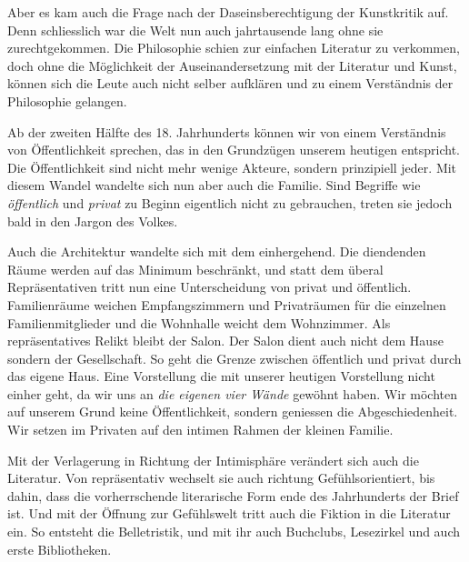 \documentclass[a4paper,ngerman,11pt]{scrartcl}
\begin{document}
Aber es kam auch die Frage nach der Daseinsberechtigung der Kunstkritik
auf. Denn schliesslich war die Welt nun auch jahrtausende lang ohne sie
zurechtgekommen. Die Philosophie schien zur einfachen Literatur zu verkommen,
doch ohne die Möglichkeit der Auseinandersetzung mit der Literatur und Kunst,
können sich die Leute auch nicht selber aufklären und zu einem Verständnis der
Philosophie gelangen.

Ab der zweiten Hälfte des 18. Jahrhunderts können wir von einem Verständnis
von Öffentlichkeit sprechen, das in den Grundzügen unserem heutigen
entspricht. Die Öffentlichkeit sind nicht mehr wenige Akteure, sondern
prinzipiell jeder. Mit diesem Wandel wandelte sich nun aber auch die
Familie. Sind Begriffe wie \emph{öffentlich} und \emph{privat} zu Beginn eigentlich
nicht zu gebrauchen, treten sie jedoch bald in den Jargon des Volkes.

Auch die Architektur wandelte sich mit dem einhergehend. Die diendenden Räume
werden auf das Minimum beschränkt, und statt dem überal Repräsentativen tritt
nun eine Unterscheidung von privat und öffentlich. Familienräume weichen
Empfangszimmern und Privaträumen für die einzelnen Familienmitglieder und die
Wohnhalle weicht dem Wohnzimmer. Als repräsentatives Relikt bleibt der
Salon. Der Salon dient auch nicht dem Hause sondern der Gesellschaft. So geht
die Grenze zwischen öffentlich und privat durch das eigene Haus. Eine
Vorstellung die mit unserer heutigen Vorstellung nicht einher geht, da wir uns
an \emph{die eigenen vier Wände} gewöhnt haben. Wir möchten auf unserem Grund keine
Öffentlichkeit, sondern geniessen die Abgeschiedenheit. Wir setzen im Privaten
auf den intimen Rahmen der kleinen Familie.

Mit der Verlagerung in Richtung der Intimisphäre verändert sich auch die
Literatur. Von repräsentativ wechselt sie auch richtung Gefühlsorientiert, bis
dahin, dass die vorherrschende literarische Form ende des Jahrhunderts der
Brief ist. Und mit der Öffnung zur Gefühlswelt tritt auch die Fiktion in die
Literatur ein. So entsteht die Belletristik, und mit ihr auch Buchclubs,
Lesezirkel und auch erste Bibliotheken.\cite{Habermas1962}



\end{document}
